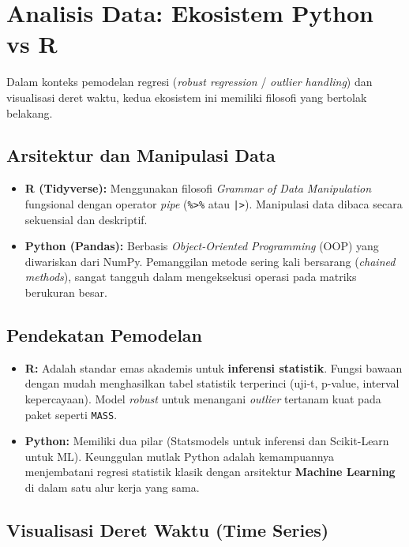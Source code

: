 \documentclass[11pt, a4paper, numbers=enddot, oneside]{scrbook}
\begin{document}
\chapter{Analisis Data: Ekosistem Python vs R}

Dalam konteks pemodelan regresi (\emph{robust regression} / \emph{outlier handling}) dan visualisasi deret waktu, kedua ekosistem ini memiliki filosofi yang bertolak belakang.

\section{Arsitektur dan Manipulasi Data}

\begin{itemize}
    \item \textbf{R (Tidyverse):} Menggunakan filosofi \emph{Grammar of Data Manipulation} fungsional dengan operator \emph{pipe} (\texttt{\%>\%} atau \texttt{|>}). Manipulasi data dibaca secara sekuensial dan deskriptif.
    \item \textbf{Python (Pandas):} Berbasis \emph{Object-Oriented Programming} (OOP) yang diwariskan dari NumPy. Pemanggilan metode sering kali bersarang (\emph{chained methods}), sangat tangguh dalam mengeksekusi operasi pada matriks berukuran besar.
\end{itemize}

\section{Pendekatan Pemodelan}

\begin{itemize}
    \item \textbf{R:} Adalah standar emas akademis untuk \textbf{inferensi statistik}. Fungsi bawaan dengan mudah menghasilkan tabel statistik terperinci (uji-t, p-value, interval kepercayaan). Model \emph{robust} untuk menangani \emph{outlier} tertanam kuat pada paket seperti \texttt{MASS}.
    \item \textbf{Python:} Memiliki dua pilar (Statsmodels untuk inferensi dan Scikit-Learn untuk ML). Keunggulan mutlak Python adalah kemampuannya menjembatani regresi statistik klasik dengan arsitektur \textbf{Machine Learning} di dalam satu alur kerja yang sama.
\end{itemize}

\section{Visualisasi Deret Waktu (Time Series)}
\end{document}

